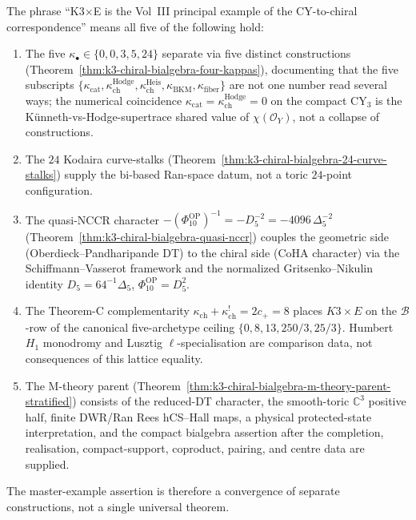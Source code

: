 \begin{remark}
\label{rem:k3-chiral-bialgebra-master-example-meaning}
The phrase ``K3$\times$E is the Vol~III principal example of the CY-to-chiral correspondence'' means all five of the following hold:
\begin{enumerate}[label=\textup{(\arabic*)}]
\item The five $\kappa_\bullet \in \{0, 0, 3, 5, 24\}$ separate via five distinct constructions (Theorem~\ref{thm:k3-chiral-bialgebra-four-kappas}), documenting that the five subscripts $\{\kappa_{\mathrm{cat}}, \kappa_{\mathrm{ch}}^{\mathrm{Hodge}}, \kappa_{\mathrm{ch}}^{\mathrm{Heis}}, \kappa_{\mathrm{BKM}}, \kappa_{\mathrm{fiber}}\}$ are not one number read several ways; the numerical coincidence $\kappa_{\mathrm{cat}} = \kappa_{\mathrm{ch}}^{\mathrm{Hodge}} = 0$ on the compact CY$_3$ is the K\"unneth-vs-Hodge-supertrace shared value of $\chi(\mathcal{O}_Y)$, not a collapse of constructions.
\item The $24$ Kodaira curve-stalks (Theorem~\ref{thm:k3-chiral-bialgebra-24-curve-stalks}) supply the bi-based Ran-space datum, not a toric $24$-point configuration.
\item The quasi-NCCR character
\(-(\Phi_{10}^{\mathrm{OP}})^{-1}=-D_5^{-2}=-4096\,\Delta_5^{-2}\)
(Theorem~\ref{thm:k3-chiral-bialgebra-quasi-nccr}) couples the geometric
side (Oberdieck--Pandharipande DT) to the chiral side (CoHA character)
via the Schiffmann--Vasserot framework and the normalized Gritsenko--Nikulin
identity \(D_5=64^{-1}\Delta_5\), \(\Phi_{10}^{\mathrm{OP}}=D_5^2\).
\item The Theorem-C complementarity $\kappa_{\mathrm{ch}} + \kappa_{\mathrm{ch}}^! = 2 c_+ = 8$ places $K3 \times E$ on the $\mathcal{B}$-row of the canonical five-archetype ceiling $\{0, 8, 13, 250/3, 25/3\}$. Humbert \(H_1\) monodromy and Lusztig \(\ell\)-specialisation are comparison data, not consequences of this lattice equality.
\item The M-theory parent (Theorem~\ref{thm:k3-chiral-bialgebra-m-theory-parent-stratified}) consists of the reduced-DT character, the smooth-toric \(\mathbb C^3\) positive half, finite DWR/Ran Rees hCS--Hall maps, a physical protected-state interpretation, and the compact bialgebra assertion after the completion, realisation, compact-support, coproduct, pairing, and centre data are supplied.
\end{enumerate}
The master-example assertion is therefore a convergence of separate
constructions, not a single universal theorem.
\end{remark}
